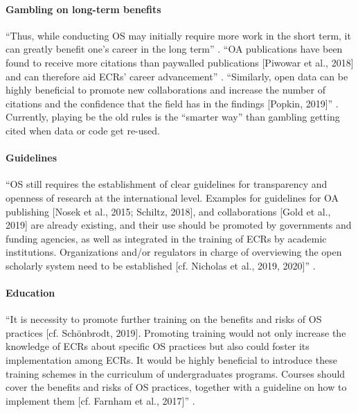 \paragraph{Gambling on long-term benefits}

%
``Thus, while conducting OS may initially require more work in the short term,
it can greatly benefit one’s career in the long term'' \citep{toribio2021early}.
%
``OA publications have been found to receive more citations than paywalled
publications [Piwowar et al., 2018] and can therefore aid ECRs’ career
advancement'' \citep{toribio2021early}.
%
``Similarly, open data can be highly beneficial to promote new collaborations
and increase the number of citations and the confidence that the field has in
the findings [Popkin, 2019]'' \citep{toribio2021early}.
%
Currently, playing be the old rules is the ``smarter way'' than gambling getting
cited when data or code get re-used.


\paragraph{Guidelines}
%
``OS still requires the establishment of clear guidelines for transparency and
openness of research at the international level.
%
Examples for guidelines for OA publishing [Nosek et al., 2015; Schiltz, 2018],
and collaborations [Gold et al., 2019] are already existing, and their use
should be promoted by governments and funding agencies, as well as integrated in
the training of ECRs by academic institutions.
%
Organizations and/or regulators in charge of overviewing the open scholarly
system need to be established [cf. Nicholas et al., 2019, 2020]''
\citep{toribio2021early}.


\paragraph{Education}


%
``It is necessity to promote further training on the benefits and risks of OS
practices [cf. Schönbrodt, 2019].
%
Promoting training would not only increase the knowledge of ECRs about specific
OS practices but also could foster its implementation among ECRs.
%
It would be highly beneficial to introduce these training schemes in the
curriculum of undergraduates programs.
%
Courses should cover the benefits and risks of OS practices, together with a
guideline on how to implement them [cf. Farnham et al., 2017]''
\citep{toribio2021early}.


